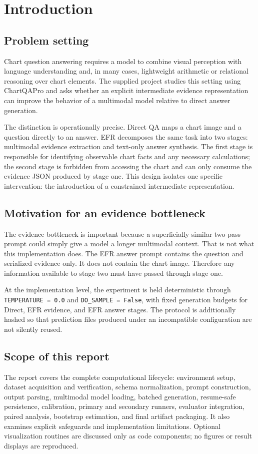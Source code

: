 \documentclass[11pt,a4paper]{article}
\newcommand{\code}[1]{\texttt{#1}}
\begin{document}
\section{Introduction}
\subsection{Problem setting}
Chart question answering requires a model to combine visual perception with language understanding and, in many cases, lightweight arithmetic or relational reasoning over chart elements. The supplied project studies this setting using ChartQAPro and asks whether an explicit intermediate evidence representation can improve the behavior of a multimodal model relative to direct answer generation.

The distinction is operationally precise. Direct QA maps a chart image and a question directly to an answer. EFR decomposes the same task into two stages: multimodal evidence extraction and text-only answer synthesis. The first stage is responsible for identifying observable chart facts and any necessary calculations; the second stage is forbidden from accessing the chart and can only consume the evidence JSON produced by stage one. This design isolates one specific intervention: the introduction of a constrained intermediate representation.

\subsection{Motivation for an evidence bottleneck}
The evidence bottleneck is important because a superficially similar two-pass prompt could simply give a model a longer multimodal context. That is not what this implementation does. The EFR answer prompt contains the question and serialized evidence only. It does not contain the chart image. Therefore any information available to stage two must have passed through stage one.

At the implementation level, the experiment is held deterministic through \code{TEMPERATURE = 0.0} and \code{DO\_SAMPLE = False}, with fixed generation budgets for Direct, EFR evidence, and EFR answer stages. The protocol is additionally hashed so that prediction files produced under an incompatible configuration are not silently reused.

\subsection{Scope of this report}
The report covers the complete computational lifecycle: environment setup, dataset acquisition and verification, schema normalization, prompt construction, output parsing, multimodal model loading, batched generation, resume-safe persistence, calibration, primary and secondary runners, evaluator integration, paired analysis, bootstrap estimation, and final artifact packaging. It also examines explicit safeguards and implementation limitations. Optional visualization routines are discussed only as code components; no figures or result displays are reproduced.
\end{document}
